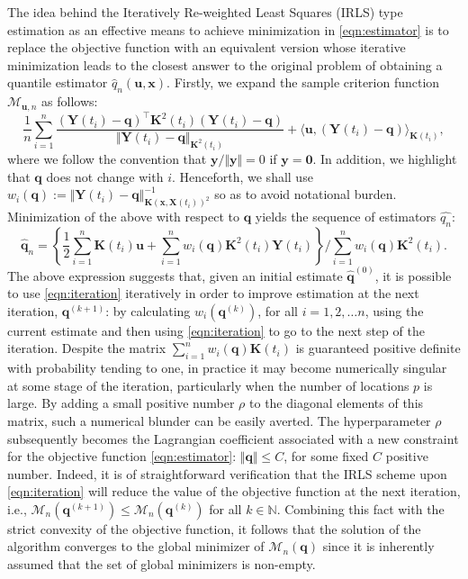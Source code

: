 \documentclass[aos]{imsart}
\theoremstyle{plain}
\theoremstyle{remark}
\def\N{\mathbb{N}}
\newcommand{\Mcal}{\mathcal{M}}
\newcommand{\bb}[1]{\boldsymbol{#1}}
\newcommand{\tr}{^{\intercal}}
\newcommand{\kernel}[1]{\bb{K}(\bb{x}, \bb{X}(#1))}
\newcommand{\cnam}[1]{\textcolor{mypurple}{#1}}
\begin{document}
The idea behind the Iteratively Re-weighted Least Squares (IRLS) type estimation as an effective means to achieve minimization in \eqref{eqn:estimator} is to replace the objective function with an equivalent version whose iterative minimization leads to the closest answer to the original problem of obtaining a quantile estimator $\hat{q}_n(\bb{u} ,\bb{x})$. Firstly, we expand the sample criterion function  $\mathcal{M}_{\bb{u},n}$ as follows:
\begin{equation*}
   \frac{1}{n}\sum_{i=1}^n \frac{\left(\bb{Y}(t_i) - \bb{q}\right)\tr \bb{K}^2(t_i) \left(\bb{Y}(t_i) - \bb{q} \right)}{\Vert \bb{Y}(t_i) - \bb{q}\Vert_{\bb{K}^2(t_i)}} + \langle \bb{u}, (\bb{Y}(t_i) - \bb{q}) \rangle_{\bb{K}(t_i)},
\end{equation*}
where we follow the convention that $\bb{y}/\Vert \bb{y} \Vert = 0$ if $ \bb{y}= \bb{0}$. In addition, we highlight that $\bb{q}$ does not change with $i$.  Henceforth, we shall use $w_i(\bb{q}) := \Vert \bb{Y}(t_i) - \bb{q}\Vert^{-1}_{\kernel{t_i}^2}$ so as to avoid notational burden. Minimization of the above with respect to $\bb{q}$ yields the sequence of estimators $\hat{q_n}$:
\begin{equation}
    \hat{\bb{q}}_n = \left\{ \frac{1}{2}\sum_{i=1}^n \bb{K}(t_i)\bb{u} + \sum_{i=1}^n w_i(\bb{q})\bb{K}^2(t_i) \bb{Y}(t_i)\right\}/{\sum_{i=1}^n w_i(\bb{q})\bb{K}^2(t_i) }.
    \label{eqn:iteration}
\end{equation}
The above \cnam{expression} suggests that, given an initial estimate $\hat{\bb{q}}^{(0)}$, it is possible to use \eqref{eqn:iteration} iteratively in order to improve estimation at the next iteration, $\bb{q}^{(k+1)}$: by calculating $w_i(\bb{q}^{(k)})$, for all $i = 1, 2, \dots n$, using the current estimate and then using \eqref{eqn:iteration} to go to the next step of the iteration. Despite the matrix $ \sum_{i=1}^n w_i(\bb{q})\bb{K}(t_i)$ is guaranteed positive definite with probability tending to one, in practice it may become numerically singular at some stage of the iteration, particularly when the number of locations $p$ is large. By adding a small positive number $\rho$ to the diagonal elements of this matrix, such a numerical blunder can be easily averted. The hyperparameter $\rho$ subsequently becomes the Lagrangian coefficient associated with a new constraint for the objective function \eqref{eqn:estimator}: $\Vert \bb{q}\Vert \leqslant C$, for some fixed $C$ positive number. Indeed, it is of straightforward verification that the IRLS scheme upon \eqref{eqn:iteration} will reduce the value of the objective function at the next iteration, i.e., $\Mcal_n(\bb{q}^{(k+1)}) \leqslant \Mcal_n(\bb{q}^{(k)})$ for all $k \in \N$. Combining this fact with the strict convexity of the objective function, it follows that the solution of the algorithm converges to the global minimizer of $\Mcal_n(\bb{q})$ since it is inherently assumed that the set of global minimizers is non-empty. 
\end{document}
